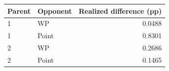 \begin{tabular}{llr}
\toprule
Parent & Opponent & Realized difference (pp) \\
\midrule
1 & WP & 0.0488 \\
1 & Point & 0.8301 \\
2 & WP & 0.2686 \\
2 & Point & 0.1465 \\
\bottomrule
\end{tabular}
